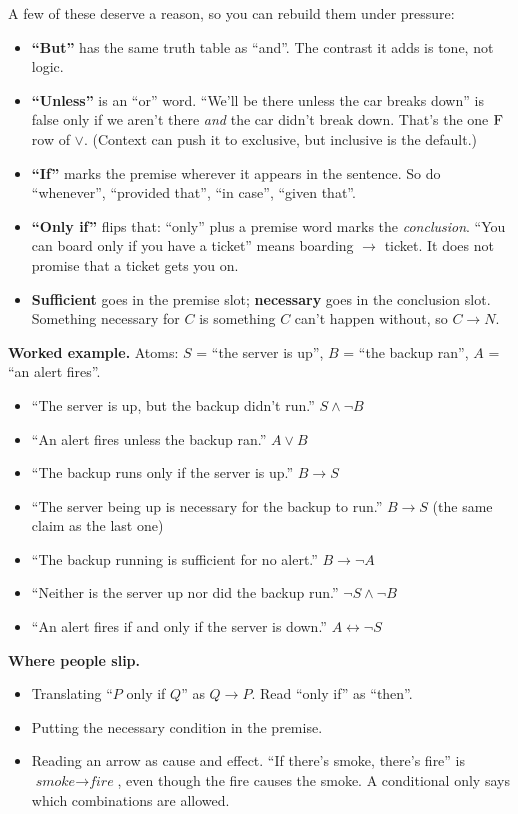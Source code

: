 A few of these deserve a reason, so you can rebuild them under pressure:
\begin{itemize}
  \item \textbf{``But''} has the same truth table as ``and''. The contrast it adds is tone, not logic.
  \item \textbf{``Unless''} is an ``or'' word. ``We'll be there unless the car breaks down'' is false only if we aren't there \emph{and} the car didn't break down. That's the one $\mathrm{F}$ row of $\lor$. (Context can push it to exclusive, but inclusive is the default.)
  \item \textbf{``If''} marks the premise wherever it appears in the sentence. So do ``whenever'', ``provided that'', ``in case'', ``given that''.
  \item \textbf{``Only if''} flips that: ``only'' plus a premise word marks the \emph{conclusion}. ``You can board only if you have a ticket'' means boarding $\to$ ticket. It does not promise that a ticket gets you on.
  \item \textbf{Sufficient} goes in the premise slot; \textbf{necessary} goes in the conclusion slot. Something necessary for $C$ is something $C$ can't happen without, so $C\to N$.
\end{itemize}

\textbf{Worked example.} Atoms: $S$ = ``the server is up'', $B$ = ``the backup ran'', $A$ = ``an alert fires''.
\begin{itemize}
  \item ``The server is up, but the backup didn't run.'' \quad $S\land\lnot B$
  \item ``An alert fires unless the backup ran.'' \quad $A\lor B$
  \item ``The backup runs only if the server is up.'' \quad $B\to S$
  \item ``The server being up is necessary for the backup to run.'' \quad $B\to S$ (the same claim as the last one)
  \item ``The backup running is sufficient for no alert.'' \quad $B\to\lnot A$
  \item ``Neither is the server up nor did the backup run.'' \quad $\lnot S\land\lnot B$
  \item ``An alert fires if and only if the server is down.'' \quad $A\leftrightarrow\lnot S$
\end{itemize}

\textbf{Where people slip.}
\begin{itemize}
  \item Translating ``$P$ only if $Q$'' as $Q\to P$. Read ``only if'' as ``then''.
  \item Putting the necessary condition in the premise.
  \item Reading an arrow as cause and effect. ``If there's smoke, there's fire'' is $\textit{smoke}\to\textit{fire}$, even though the fire causes the smoke. A conditional only says which combinations are allowed.
\end{itemize}

